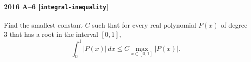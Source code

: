 \paragraph{2016 A--6 \textnormal{[\texttt{integral-inequality}]}}
Find the smallest constant $C$ such that for every real polynomial $P(x)$ of degree 3 that has a root in the interval $[0,1]$,
\[
\int_0^1 \left| P(x) \right|\,dx \leq C \max_{x \in [0,1]} \left| P(x) \right|.
\]
